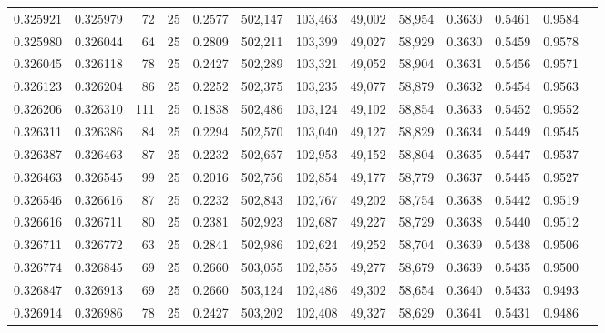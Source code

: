 \begin{tabular}{rrrrrrrrrrrrr}
0.325921 & 0.325979 &    72 &  25 &                                     0.2577 & 502,147 & 103,463 &  49,002 &  58,954 & 0.3630 & 0.5461 & 0.9584 \\
0.325980 & 0.326044 &    64 &  25 &                                     0.2809 & 502,211 & 103,399 &  49,027 &  58,929 & 0.3630 & 0.5459 & 0.9578 \\
0.326045 & 0.326118 &    78 &  25 &                                     0.2427 & 502,289 & 103,321 &  49,052 &  58,904 & 0.3631 & 0.5456 & 0.9571 \\
0.326123 & 0.326204 &    86 &  25 &                                     0.2252 & 502,375 & 103,235 &  49,077 &  58,879 & 0.3632 & 0.5454 & 0.9563 \\
0.326206 & 0.326310 &   111 &  25 &                                     0.1838 & 502,486 & 103,124 &  49,102 &  58,854 & 0.3633 & 0.5452 & 0.9552 \\
0.326311 & 0.326386 &    84 &  25 &                                     0.2294 & 502,570 & 103,040 &  49,127 &  58,829 & 0.3634 & 0.5449 & 0.9545 \\
0.326387 & 0.326463 &    87 &  25 &                                     0.2232 & 502,657 & 102,953 &  49,152 &  58,804 & 0.3635 & 0.5447 & 0.9537 \\
0.326463 & 0.326545 &    99 &  25 &                                     0.2016 & 502,756 & 102,854 &  49,177 &  58,779 & 0.3637 & 0.5445 & 0.9527 \\
0.326546 & 0.326616 &    87 &  25 &                                     0.2232 & 502,843 & 102,767 &  49,202 &  58,754 & 0.3638 & 0.5442 & 0.9519 \\
0.326616 & 0.326711 &    80 &  25 &                                     0.2381 & 502,923 & 102,687 &  49,227 &  58,729 & 0.3638 & 0.5440 & 0.9512 \\
0.326711 & 0.326772 &    63 &  25 &                                     0.2841 & 502,986 & 102,624 &  49,252 &  58,704 & 0.3639 & 0.5438 & 0.9506 \\
0.326774 & 0.326845 &    69 &  25 &                                     0.2660 & 503,055 & 102,555 &  49,277 &  58,679 & 0.3639 & 0.5435 & 0.9500 \\
0.326847 & 0.326913 &    69 &  25 &                                     0.2660 & 503,124 & 102,486 &  49,302 &  58,654 & 0.3640 & 0.5433 & 0.9493 \\
0.326914 & 0.326986 &    78 &  25 &                                     0.2427 & 503,202 & 102,408 &  49,327 &  58,629 & 0.3641 & 0.5431 & 0.9486 \\

\end{tabular}
